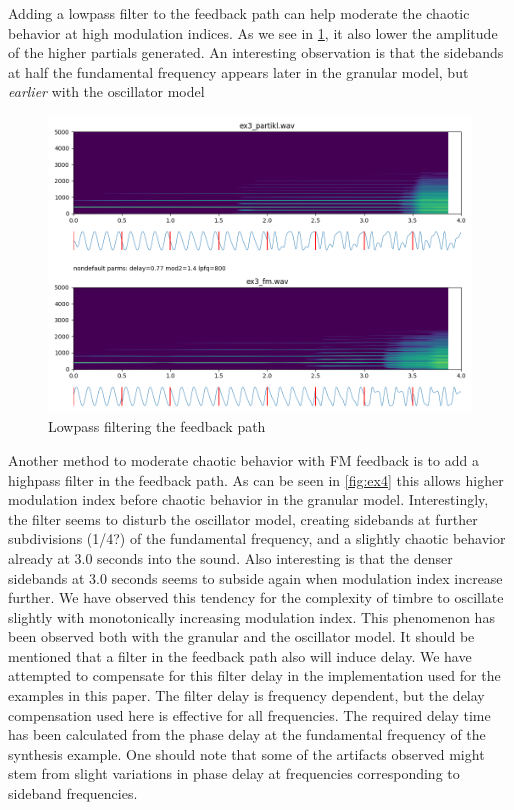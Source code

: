\documentclass[runningheads,a4paper]{llncs}
\begin{document}
Adding a lowpass filter to the feedback path can help moderate the chaotic behavior at high modulation indices. As we see in \ref{fig:ex3}, it also lower the amplitude of the higher partials generated. An interesting observation is that the sidebands at half the fundamental frequency appears later in the granular model, but \emph{earlier} with the oscillator model

\begin{figure}
	\centering
	\includegraphics[width=.95\textwidth]{ex3_compare.png}
	\caption{Lowpass filtering the feedback path}
	\label{fig:ex3}
\end{figure}

Another method to moderate chaotic behavior with FM feedback is to add a highpass filter in the feedback path. As can be seen in \ref{fig:ex4} this allows higher modulation index before chaotic behavior in the granular model. Interestingly, the filter seems to disturb the oscillator model, creating sidebands at further subdivisions (1/4?) of the fundamental frequency, and a slightly chaotic behavior already at 3.0 seconds into the sound. Also interesting is that the denser sidebands at 3.0 seconds seems to subside again when modulation index increase further. We have observed this tendency for the complexity of timbre to oscillate slightly with monotonically increasing modulation index. This phenomenon has been observed both with the granular and the oscillator model. It should be mentioned that a filter in the feedback path also will induce delay. We have attempted to compensate for this filter delay in the implementation used for the examples in this paper. The filter delay is frequency dependent, but the delay compensation used here is effective for all frequencies. The required delay time has been calculated from the phase delay at the fundamental frequency of the synthesis example. One should note that some of the artifacts observed might stem from slight variations in phase delay at frequencies corresponding to sideband frequencies.
\end{document}
